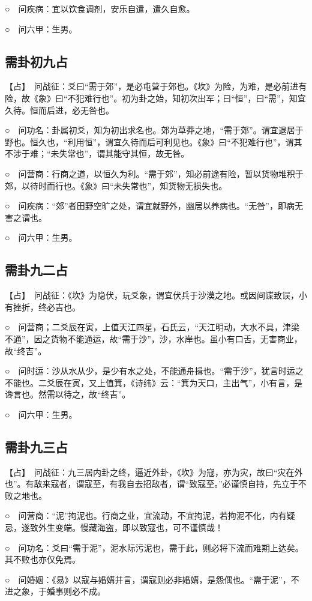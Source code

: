 \documentclass[12pt,oneside]{book}
\begin{document}
○　问疾病：宜以饮食调剂，安乐自遣，遣久自愈。

○　问六甲：生男。

\subsection{需卦初九占}
【占】　问战征：爻曰“需于郊”，是必屯营于郊也。《坎》为险，为难，是必前进有险，故《象》曰“不犯难行也”。初为卦之始，知初次出军；曰“恒”，曰“需”，知宜久待。恒而后进，必无咎也。

○　问功名：卦属初爻，知为初出求名也。郊为草莽之地，“需于郊”。谓宜退居于野也。恒久也，“利用恒”，谓宜久待而后可利见也。《象》曰“不犯难行也”，谓其不涉于难；“未失常也”，谓其能守其恒，故无咎。

○　问营商：行商之道，以恒久为利。“需于郊”，知必前途有险，暂以货物堆积于郊，以待时而行也。《象》曰“未失常也”，知货物无损失也。

○　问疾病：“郊”者田野空旷之处，谓宜就野外，幽居以养病也。“无咎”，即病无害之谓也。

○　问六甲：生男。

\subsection{需卦九二占}
【占】　问战征：《坎》为隐伏，玩爻象，谓宜伏兵于沙漠之地。或因间谍致误，小有挫折，终必吉也。

○　问营商；二爻辰在寅，上值天江四星，石氏云，“天江明动，大水不具，津梁不通”，因之货物不能通运，故“需于沙”，沙，水岸也。虽小有口舌，无害商业，故“终吉”。

○　问时运：沙从水从少，是少有水之处，不能通舟揖也。“需于沙”，犹言时运之不能也。二爻辰在寅，又上值箕，《诗纬》云：“箕为天口，主出气”，小有言，是谗言也。然需以待之，故“终吉”。

○　问六甲：生男。

\subsection{需卦九三占}
【占】　问战征：九三居内卦之终，逼近外卦，《坎》为寇，亦为灾，故曰“灾在外也”。有敌来寇者，谓寇至，有我自去招敌者，谓“致寇至。”必谨慎自持，先立于不败之地也。

○　问营商：“泥”拘泥也。行商之业，宜流动，不宜拘泥，若拘泥不化，内有疑忌，遂致外生变端。慢藏海盗，即以致寇也，可不谨慎哉！

○　问功名：爻曰“需于泥”，泥水际污泥也，需于此，则必将下流而难期上达矣。其不败也亦仅免焉。

○　问婚姻：《易》以寇与婚媾并言，谓寇则必非婚媾，是怨偶也。“需于泥”，不进之象，于婚事则必不成。
\end{document}
